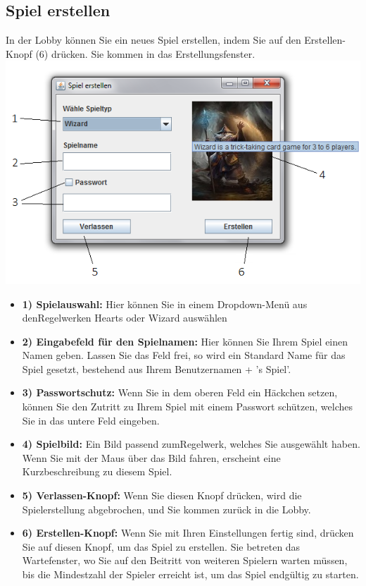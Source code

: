 \documentclass[titlepage,10pt,a4paper]{article}
\begin{document}
\subsection{Spiel erstellen}
In der Lobby können Sie ein neues Spiel erstellen, indem Sie auf den Erstellen-Knopf (6)  drücken. Sie kommen in das \gls{Erstellungsfenster}.\\
\includegraphics[width=\textwidth]{Erstellungs-Fenster}
\begin{itemize}
	\item \textbf{1) Spielauswahl:} Hier können Sie in einem Dropdown-Menü aus den\gls{Regelwerk}en Hearts oder Wizard auswählen
	\item \textbf{2) Eingabefeld für den Spielnamen:} Hier können Sie Ihrem Spiel einen Namen geben. Lassen Sie das Feld frei, so wird ein Standard Name für das Spiel gesetzt, bestehend aus Ihrem Benutzernamen + 's Spiel'.
	\item \textbf{3) Passwortschutz:} Wenn Sie in dem oberen Feld ein Häckchen setzen, können Sie den Zutritt zu Ihrem Spiel mit einem Passwort schützen, welches Sie in das untere Feld eingeben.
	\item \textbf{4) Spielbild:} Ein Bild passend zum\gls{Regelwerk}, welches Sie ausgewählt haben. Wenn Sie mit der Maus über das Bild fahren, erscheint eine Kurzbeschreibung zu diesem Spiel.
	\item \textbf{5) Verlassen-Knopf:} Wenn Sie diesen Knopf drücken, wird die Spielerstellung abgebrochen, und Sie kommen zurück in die Lobby.
	\item \textbf{6) Erstellen-Knopf:} Wenn Sie mit Ihren Einstellungen fertig sind, drücken Sie auf diesen Knopf, um das Spiel zu erstellen. Sie betreten das \gls{Wartefenster}, wo Sie auf den Beitritt von weiteren Spielern warten müssen, bis die Mindestzahl der Spieler erreicht ist, um das Spiel endgültig zu starten.	
\end{itemize}
\end{document}

